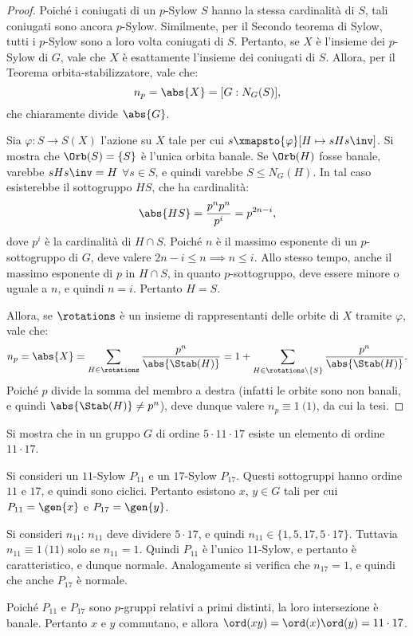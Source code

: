 \documentclass[12pt]{scrartcl}
\begin{document}
	\begin{proof}
		Poiché i coniugati di un $p$-Sylow $S$ hanno la stessa cardinalità di $S$, tali coniugati sono ancora
		$p$-Sylow. Similmente, per il Secondo teorema di Sylow, tutti
		i $p$-Sylow sono a loro volta coniugati di $S$. Pertanto,
		se $X$ è l'insieme dei $p$-Sylow di $G$, vale che
		$X$ è esattamente l'insieme dei coniugati di $S$. Allora,
		per il Teorema orbita-stabilizzatore, vale che:
		\[ n_p = \abs{X} = [G : N_G(S)], \]
		che chiaramente divide $\abs{G}$. \medskip
		
		
		Sia $\varphi : S \to S(X)$ l'azione su $X$ tale per cui
		$s \xmapsto{\varphi} [H \mapsto sHs\inv]$. Si mostra
		che $\Orb(S) = \{S\}$ è l'unica orbita banale. Se
		$\Orb(H)$ fosse banale, varebbe $sHs\inv = H$ $\forall s \in S$,
		e quindi varebbe $S \leq N_G(H)$. In tal caso esisterebbe
		il sottogruppo $HS$, che ha cardinalità:
		\[ \abs{HS} = \frac{p^n p^n}{p^i} = p^{2n-i}, \]
		dove $p^i$ è la cardinalità di $H \cap S$. Poiché
		$n$ è il massimo esponente di un $p$-sottogruppo di
		$G$, deve valere $2n-i \leq n \implies n \leq i$. Allo
		stesso tempo, anche il massimo esponente di $p$ in
		$H \cap S$, in quanto $p$-sottogruppo, deve essere
		minore o uguale a $n$, e quindi $n = i$. Pertanto
		$H = S$. \medskip
		
		
		Allora, se $\rotations$ è un insieme di rappresentanti
		delle orbite di $X$ tramite $\varphi$, vale che:
		\[ n_p = \abs{X} = \sum_{H \in \rotations} \frac{p^n}{\abs{\Stab(H)}} = 1 + \sum_{H \in \rotations \setminus \{S\}} \frac{p^n}{\abs{\Stab(H)}}. \]
		Poiché $p$ divide la somma del membro a destra (infatti
		le orbite sono non banali, e quindi $\abs{\Stab(H)} \neq p^n$),
		deve dunque valere $n_p \equiv 1 \pod 1$, da cui la tesi.
	\end{proof}
	
	\begin{example}
		Si mostra che in un gruppo $G$ di ordine $5 \cdot 11 \cdot 17$
		esiste un elemento di ordine $11 \cdot 17$. \medskip
		
		Si consideri un $11$-Sylow $P_{11}$ e un $17$-Sylow $P_{17}$.
		Questi sottogruppi hanno ordine $11$ e $17$, e quindi
		sono ciclici. Pertanto esistono $x$, $y \in G$ tali per
		cui $P_{11} = \gen{x}$ e $P_{17} = \gen{y}$. \medskip
		
		Si consideri $n_{11}$: $n_{11}$ deve dividere $5 \cdot 17$,
		e quindi $n_{11} \in \{1, 5, 17, 5 \cdot 17\}$. Tuttavia
		$n_{11} \equiv 1 \pod{11}$ solo se $n_{11} = 1$. Quindi
		$P_{11}$ è l'unico $11$-Sylow, e pertanto è caratteristico,
		e dunque normale. Analogamente si verifica che $n_{17} = 1$,
		e quindi che anche $P_{17}$ è normale. \medskip
		
		Poiché $P_{11}$ e $P_{17}$ sono $p$-gruppi relativi a primi
		distinti, la loro intersezione è banale. Pertanto
		$x$ e $y$ commutano, e allora $\ord(xy) = \ord(x) \ord(y) =
		11 \cdot 17$.
	\end{example}
\end{document}
